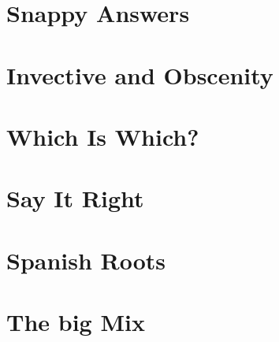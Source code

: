 \chapter{Snappy Answers}

\chapter{Invective and Obscenity}

\chapter{Which Is Which?}

\chapter{Say It Right}

\chapter{Spanish Roots}

\chapter{The big Mix}



